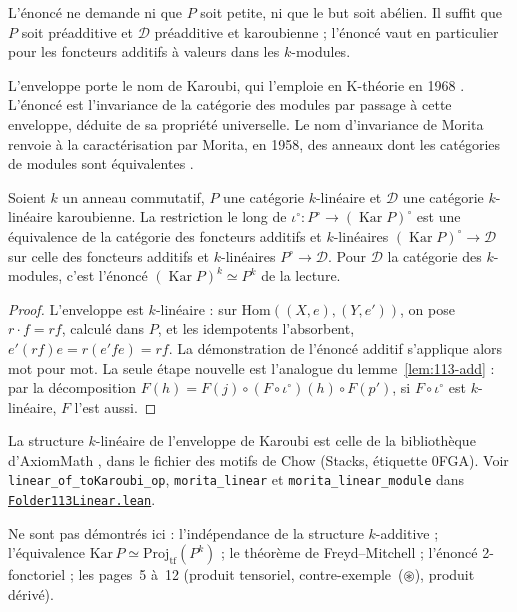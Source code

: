 \begin{remarque}
L'énoncé ne demande ni que $P$ soit petite, ni que le but soit abélien. Il suffit que $P$ soit préadditive et $\mathcal D$ préadditive et karoubienne ; l'énoncé vaut en particulier pour les foncteurs additifs à valeurs dans les $k$-modules.
\end{remarque}

\begin{remarque}
L'enveloppe porte le nom de Karoubi, qui l'emploie en K-théorie en 1968 \cite{karoubi1968}. L'énoncé est l'invariance de la catégorie des modules par passage à cette enveloppe, déduite de sa propriété universelle. Le nom d'invariance de Morita renvoie à la caractérisation par Morita, en 1958, des anneaux dont les catégories de modules sont équivalentes \cite{morita1958}.
\end{remarque}

\begin{enonce}
Soient $k$ un anneau commutatif, $P$ une catégorie $k$-linéaire et $\mathcal D$ une catégorie $k$-linéaire karoubienne. La restriction le long de $\iota^\circ : P^\circ \to (\operatorname{Kar} P)^\circ$ est une équivalence de la catégorie des foncteurs additifs et $k$-linéaires $(\operatorname{Kar} P)^\circ \to \mathcal D$ sur celle des foncteurs additifs et $k$-linéaires $P^\circ \to \mathcal D$. Pour $\mathcal D$ la catégorie des $k$-modules, c'est l'énoncé $(\operatorname{Kar} P)^k \simeq P^k$ de la lecture.
\end{enonce}

\begin{proof}
L'enveloppe est $k$-linéaire : sur $\mathrm{Hom}((X, e), (Y, e'))$, on pose $r \cdot f = r f$, calculé dans $P$, et les idempotents l'absorbent, $e'(rf)e = r(e'fe) = rf$. La démonstration de l'énoncé additif s'applique alors mot pour mot. La seule étape nouvelle est l'analogue du lemme~\ref{lem:113-add} : par la décomposition $F(h) = F(j) \circ (F \circ \iota^\circ)(h) \circ F(p')$, si $F \circ \iota^\circ$ est $k$-linéaire, $F$ l'est aussi.
\end{proof}

\noindent La structure $k$-linéaire de l'enveloppe de Karoubi est celle de la bibliothèque d'AxiomMath \cite{axiomstacks}, dans le fichier des motifs de Chow (Stacks, étiquette 0FGA). Voir \texttt{linear\_of\_toKaroubi\_op}, \texttt{morita\_linear} et \texttt{morita\_linear\_module} dans \href{\leanblobmain/CategoryTheory/Folder113Linear.lean}{\texttt{Folder113Linear.\allowbreak{}lean}}.

Ne sont pas démontrés ici : l'indépendance de la structure $k$-additive ; l'équivalence $\mathrm{Kar}\,P \simeq \mathrm{Proj}_{\mathrm{tf}}(P^k)$ ; le théorème de Freyd--Mitchell ; l'énoncé 2-fonctoriel ; les pages~5 à~12 (produit tensoriel, contre-exemple~($\circledast$), produit dérivé).
